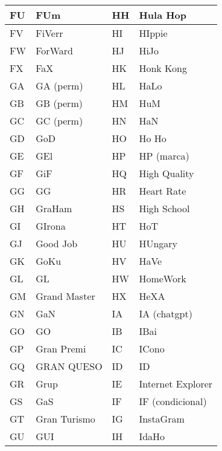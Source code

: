 \begin{table}[!ht]
    \centering
    \begin{tabular}{l|l|l|l}
    FU & FUm            & HH & Hula Hop             \\\hline
    FV & FiVerr         & HI & HIppie               \\\hline
    FW & ForWard        & HJ & HiJo                 \\\hline
    FX & FaX            & HK & Honk Kong            \\\hline
    GA & GA (perm)      & HL & HaLo                 \\\hline
    GB & GB (perm)      & HM & HuM                  \\\hline
    GC & GC (perm)      & HN & HaN                  \\\hline
    GD & GoD            & HO & Ho Ho                \\\hline
    GE & GEl            & HP & HP (marca)           \\\hline
    GF & GiF            & HQ & High Quality         \\\hline
    GG & GG             & HR & Heart Rate           \\\hline
    GH & GraHam         & HS & High School          \\\hline
    GI & GIrona         & HT & HoT                  \\\hline
    GJ & Good Job       & HU & HUngary              \\\hline
    GK & GoKu           & HV & HaVe                 \\\hline
    GL & GL             & HW & HomeWork             \\\hline
    GM & Grand Master   & HX & HeXA                 \\\hline
    GN & GaN            & IA & IA (chatgpt)         \\\hline
    GO & GO             & IB & IBai                 \\\hline
    GP & Gran Premi     & IC & ICono                \\\hline
    GQ & GRAN QUESO     & ID & ID                   \\\hline
    GR & Grup           & IE & Internet Explorer    \\\hline
    GS & GaS            & IF & IF (condicional)     \\\hline
    GT & Gran Turismo   & IG & InstaGram            \\\hline
    GU & GUI            & IH & IdaHo                \\\hline

\end{tabular}
\end{table}
